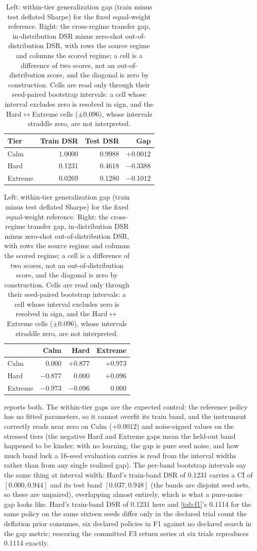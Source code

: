 \begin{table}[t]
\centering
\caption{Left: within-tier generalization gap (train minus test deflated Sharpe) for the fixed equal-weight reference. Right: the cross-regime transfer gap, in-distribution DSR minus zero-shot out-of-distribution DSR, with rows the source regime and columns the scored regime; a cell is a difference of two scores, not an out-of-distribution score, and the diagonal is zero by construction. Cells are read only through their seed-paired bootstrap intervals: a cell whose interval excludes zero is resolved in sign, and the Hard$\leftrightarrow$Extreme cells ($\pm 0.096$), whose intervals straddle zero, are not interpreted.}
\label{tab:f3}
\small
\begin{tabular}{lrrr}
\toprule
Tier & Train DSR & Test DSR & Gap \\
\midrule
Calm & 1.0000 & 0.9988 & $+0.0012$ \\
Hard & 0.1231 & 0.4618 & $-0.3388$ \\
Extreme & 0.0269 & 0.1280 & $-0.1012$ \\
\bottomrule
\end{tabular}
\hspace{1.5em}
\begin{tabular}{lrrr}
\toprule
 & Calm & Hard & Extreme \\
\midrule
Calm & 0.000 & $+0.877$ & $+0.973$ \\
Hard & $-0.877$ & 0.000 & $+0.096$ \\
Extreme & $-0.973$ & $-0.096$ & 0.000 \\
\bottomrule
\end{tabular}
\end{table}

 reports both. The within-tier gaps are the expected control: the reference policy has no fitted parameters, so it cannot overfit its train band, and the instrument correctly reads near zero on Calm ($+0.0012$) and noise-signed values on the stressed tiers (the negative Hard and Extreme gaps mean the held-out band happened to be kinder; with no learning, the gap is pure seed noise, and how much band luck a 16-seed evaluation carries is read from the interval widths rather than from any single realized gap). The per-band bootstrap intervals say the same thing at interval width: Hard's train-band DSR of 0.1231 carries a CI of $[0.000, 0.944]$ and its test band $[0.037, 0.948]$ (the bands are disjoint seed sets, so these are unpaired), overlapping almost entirely, which is what a pure-noise gap looks like. Hard's train-band DSR of 0.1231 here and \cref{tab:f1}'s 0.1114 for the same policy on the same sixteen seeds differ only in the declared trial count the deflation prior consumes, six declared policies in F1 against no declared search in the gap metric; rescoring the committed F3 return series at six trials reproduces 0.1114 exactly.

